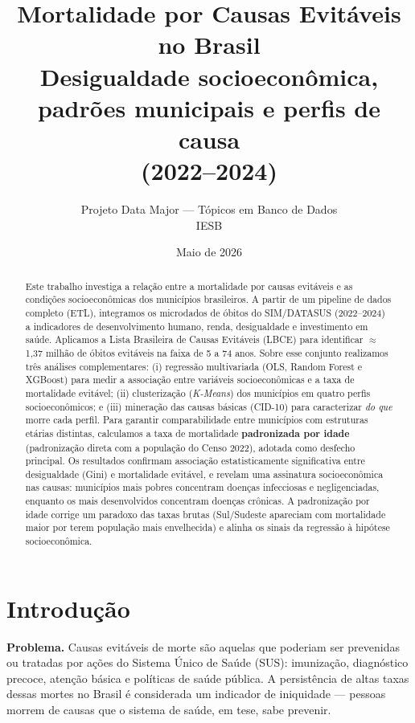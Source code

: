 \documentclass[11pt,a4paper]{article}
\title{\textbf{Mortalidade por Causas Evitáveis no Brasil}\\[0.3em]
\large Desigualdade socioeconômica, padrões municipais e perfis de causa\\(2022--2024)}
\author{Projeto Data Major --- Tópicos em Banco de Dados\\IESB}
\date{Maio de 2026}
\begin{document}
\maketitle
\thispagestyle{empty}
\clearpage

\begin{abstract}
\noindent Este trabalho investiga a relação entre a mortalidade por causas evitáveis e as
condições socioeconômicas dos municípios brasileiros. A partir de um pipeline de dados
completo (ETL), integramos os microdados de óbitos do SIM/DATASUS (2022--2024) a indicadores
de desenvolvimento humano, renda, desigualdade e investimento em saúde. Aplicamos a Lista
Brasileira de Causas Evitáveis (LBCE) para identificar $\approx$1,37 milhão de óbitos
evitáveis na faixa de 5 a 74 anos. Sobre esse conjunto realizamos três análises
complementares: (i) regressão multivariada (OLS, Random Forest e XGBoost) para medir a
associação entre variáveis socioeconômicas e a taxa de mortalidade evitável;
(ii) clusterização (\emph{K-Means}) dos municípios em quatro perfis socioeconômicos; e
(iii) mineração das causas básicas (CID-10) para caracterizar \emph{do que} morre cada perfil.
Para garantir comparabilidade entre municípios com estruturas etárias distintas, calculamos a
taxa de mortalidade \textbf{padronizada por idade} (padronização direta com a população do
Censo 2022), adotada como desfecho principal. Os resultados confirmam associação
estatisticamente significativa entre desigualdade (Gini) e mortalidade evitável, e revelam uma
assinatura socioeconômica nas causas: municípios mais pobres concentram doenças infecciosas e
negligenciadas, enquanto os mais desenvolvidos concentram doenças crônicas. A padronização por
idade corrige um paradoxo das taxas brutas (Sul/Sudeste apareciam com mortalidade maior por
terem população mais envelhecida) e alinha os sinais da regressão à hipótese socioeconômica.
\end{abstract}

\clearpage
\tableofcontents
\clearpage

\section{Introdução}

\textbf{Problema.} Causas evitáveis de morte são aquelas que poderiam ser prevenidas ou
tratadas por ações do Sistema Único de Saúde (SUS): imunização, diagnóstico precoce, atenção
básica e políticas de saúde pública. A persistência de altas taxas dessas mortes no Brasil é
considerada um indicador de iniquidade --- pessoas morrem de causas que o sistema de saúde,
em tese, sabe prevenir.
\end{document}
